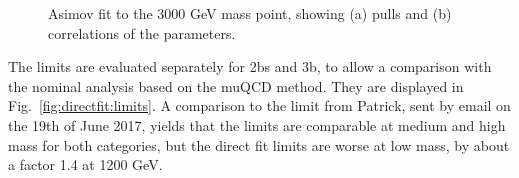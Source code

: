 \begin{figure}[htbp!]
\begin{center}
\caption{Asimov fit to the 3000 GeV mass point, showing (a) pulls and (b) correlations of the parameters.}
\label{fig:directfit:asimov3000}
\end{center}
\end{figure}

The limits are evaluated separately for 2bs and 3b, to allow a comparison with the nominal analysis based on the muQCD method. They are displayed in Fig.~\ref{fig:directfit:limits}. A comparison to the limit from Patrick, sent by email on the 19th of June 2017, yields that the limits are comparable at medium and high mass for both categories, but the direct fit limits are worse at low mass, by about a factor 1.4 at 1200 GeV.

